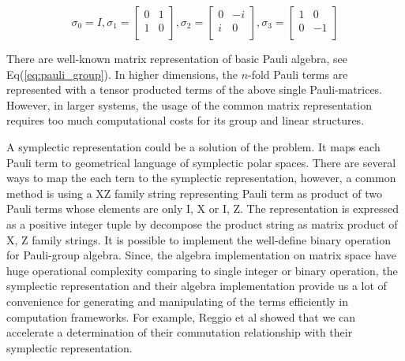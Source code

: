 \documentclass[twocolumn]{article}
\begin{document}
\begin{equation}
    \label{eq:pauli_group}
    \sigma_0 = I, 
    \sigma_1 = \begin{bmatrix}
        0 & 1 \\
        1 & 0 \\
    \end{bmatrix},
    \sigma_2 = \begin{bmatrix}
        0 & -i \\
        i & 0 \\
    \end{bmatrix},
    \sigma_3 = \begin{bmatrix}
        1 & 0 \\
        0 & -1 \\
    \end{bmatrix}
\end{equation}

There are well-known matrix representation of basic Pauli algebra, see Eq(\ref{eq:pauli_group}).
In higher dimensions, the $n$-fold Pauli terms are represented with a tensor producted terms of the above single Pauli-matrices. 
However, in larger systems, the usage of the common matrix representation requires too much computational costs 
for its group and linear structures. 

A symplectic representation could be a solution of the problem. 
It maps each Pauli term to geometrical language of symplectic polar spaces\cite{havlicek_moebius_2009}.
There are several ways to map the each tern to the symplectic representation, 
however, a common method is using a XZ family string representing Pauli term as product of two Pauli terms whose elements are only I, X or I, Z.
The representation is expressed as a positive integer tuple by decompose the product string as matrix product of X, Z family strings.
It is possible to implement the well-define binary operation for Pauli-group algebra.
Since, the algebra implementation on matrix space have huge operational complexity comparing to 
single integer or binary operation, the symplectic representation and their algebra implementation 
provide us a lot of convenience for generating and manipulating of the terms efficiently in computation frameworks.
For example, Reggio et al showed that we can accelerate a determination of their commutation relationship 
with their symplectic representation\cite{reggio_fast_2023}.
\end{document}
